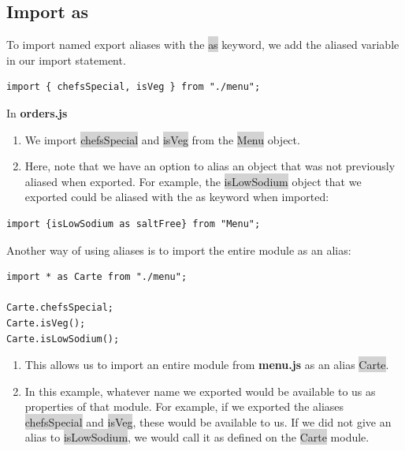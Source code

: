\documentclass[11pt]{article}
\begin{document}
\subsection{Import as}
To import named export aliases with the \colorbox{lightgray}{as} keyword, we add the aliased variable in our import statement.
\begin{lstlisting}
import { chefsSpecial, isVeg } from "./menu";
\end{lstlisting}
In \textbf{orders.js}
\begin{enumerate}[leftmargin = *]
\item We import \colorbox{lightgray}{chefsSpecial} and \colorbox{lightgray}{isVeg} from the \colorbox{lightgray}{Menu} object.
\item Here, note that we have an option to alias an object that was not previously aliased when exported. For example, the \colorbox{lightgray}{isLowSodium} object that we exported could be aliased with the as keyword when imported: 
\end{enumerate}
\begin{lstlisting}
import {isLowSodium as saltFree} from "Menu";
\end{lstlisting}
Another way of using aliases is to import the entire module as an alias:
\begin{lstlisting}
import * as Carte from "./menu";

Carte.chefsSpecial;
Carte.isVeg();
Carte.isLowSodium(); 
\end{lstlisting}
\begin{enumerate}[leftmargin = *]
\item This allows us to import an entire module from \textbf{menu.js} as an alias \colorbox{lightgray}{Carte}.
\item In this example, whatever name we exported would be available to us as properties of that module. For example, if we exported the aliases \colorbox{lightgray}{chefsSpecial} and \colorbox{lightgray}{isVeg}, these would be available to us. If we did not give an alias to \colorbox{lightgray}{isLowSodium}, we would call it as defined on the \colorbox{lightgray}{Carte} module.
\end{enumerate}
\end{document}
